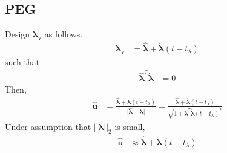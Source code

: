 \documentclass{fdclreport}
\begin{document}
\subsection{PEG}
Design $\bm{\lambda_v}$ as follows.
\begin{align}
	\bm{\lambda_v} &= \bm{\hat{\lambda}} + \bm{\dot{\lambda}} (t-t_{\lambda})
\end{align}
such that
\begin{align}
	\bm{\hat{\lambda}}^T \bm{\dot{\lambda}} &= 0
\end{align}
Then,
\begin{align}
	\bm{\hat{u}} &= \frac{\bm{\hat{\lambda}} + \bm{\dot{\lambda}} (t-t_{\lambda})}{|\bm{\hat{\lambda}} + \bm{\dot{\lambda}|}}
	= \frac{\bm{\hat{\lambda}} + \bm{\dot{\lambda}} (t-t_{\lambda})}{\sqrt{1 + \bm{\dot{\lambda}}^T\bm{\dot{\lambda}}(t-t_{\lambda})^2}}
\end{align}
Under assumption that $||\bm{\dot{\lambda}}||_2$ is small,
\begin{align}
	\bm{\hat{u}} & \approx \bm{\hat{\lambda}} + \bm{\dot{\lambda}}(t-t_{\lambda}) \label{eq:approx}
\end{align}
\end{document}
